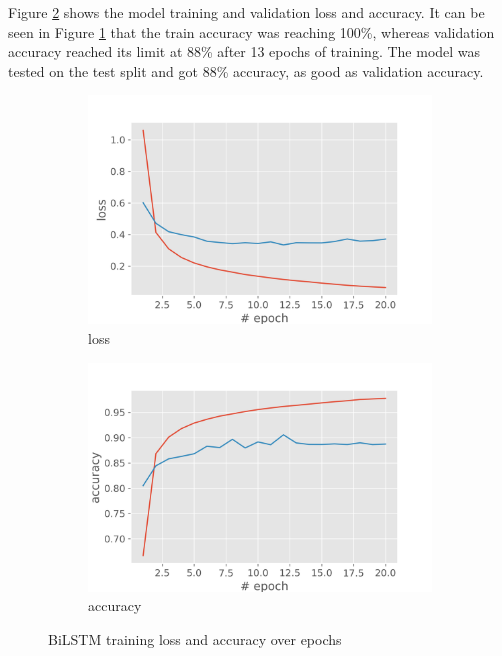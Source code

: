 \documentclass[12pt,article]{article}
\begin{document}
Figure \ref{fig:biLSTM-training} shows the model training and validation loss and accuracy. It can be seen in Figure \ref{fig:biLSTM-training-accuracy} that the train accuracy was reaching 100\%, whereas validation accuracy reached its limit at 88\% after 13 epochs of training. The model was tested on the test split and got 88\% accuracy, as good as validation accuracy.

\begin{figure}[H]
\centering
\begin{subfigure}{.5\textwidth}
    \centering
    \includegraphics[scale=0.6]{pos-tag-lstm-loss.png} \par
    \caption{loss}
\end{subfigure}%
\begin{subfigure}{.5\textwidth}
    \centering
    \includegraphics[scale=0.6]{pos-tag-lstm-acc.png} \par
    \caption{accuracy}
    \label{fig:biLSTM-training-accuracy}
\end{subfigure}
\caption{BiLSTM training loss and accuracy over epochs}
\label{fig:biLSTM-training}
\end{figure}
\end{document}
